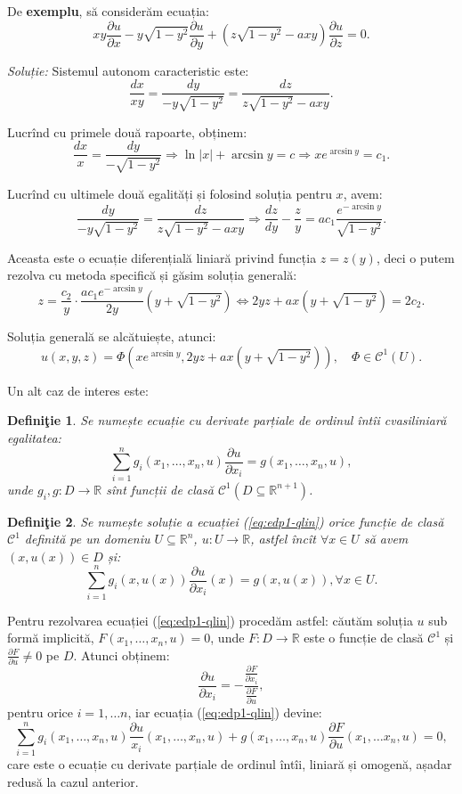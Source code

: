\documentclass[11pt,a4paper]{article}
\newcommand\kal{\mathcal}
\newcommand\seq{\subseteq}
\newcommand\RR{\mathbb{R}}
\theoremstyle{dotless}
\theoremstyle{dotlessdr}
\newtheorem{definition}{Defini\c{t}ie}[section]
\begin{document}
De \textbf{exemplu}, să considerăm ecuația:
\[
  xy \frac{\partial u}{\partial x} - y \sqrt{1 - y^2} \frac{\partial u}{\partial y} + %
  (z \sqrt{1 - y^2} - axy) \frac{\partial u}{\partial z} = 0.
\]

\emph{Soluție:} Sistemul autonom caracteristic este:
\[
  \frac{dx}{xy} = \frac{dy}{-y\sqrt{1 - y^2}} = \frac{dz}{z\sqrt{1 - y^2} - axy}.
\]

Lucrînd cu primele două rapoarte, obținem:
\[
  \frac{dx}{x} = \frac{dy}{-\sqrt{1 - y^2}} \Rightarrow \ln |x| + \arcsin y = c \Rightarrow %
  xe^{\arcsin y} = c_1.
\]

Lucrînd cu ultimele două egalități și folosind soluția pentru $ x $, avem:
\[
  \frac{dy}{-y\sqrt{1 - y^2}} = \frac{dz}{z \sqrt{1 - y^2} - axy} \Rightarrow %
  \frac{dz}{dy} - \frac{z}{y} = ac_1 \frac{e^{-\arcsin y}}{\sqrt{1 - y^2}}.
\]

Aceasta este o ecuație diferențială liniară privind funcția $ z = z(y) $, deci o putem rezolva
cu metoda specifică și găsim soluția generală:
\[
  z = \frac{c_2}{y} \cdot \frac{ac_1 e^{-\arcsin y}}{2y} (y + \sqrt{1 - y^2}) \Leftrightarrow %
  2yz + ax(y + \sqrt{1 - y^2}) = 2c_2.
\]

Soluția generală se alcătuiește, atunci:
\[
  u(x, y, z) = \Phi(xe^{\arcsin y}, 2yz + ax(y + \sqrt{1 - y^2})), \quad \Phi \in \kal{C}^1(U).
\]

Un alt caz de interes este:
\begin{definition}\label{def:edp1-qlin}
  Se numește \emph{ecuație cu derivate parțiale de ordinul întîi cvasiliniară} egalitatea:
  \begin{equation} \label{eq:edp1-qlin}
    \sum_{i = 1}^n g_i(x_1, \dots, x_n, u) \frac{\partial u}{\partial x_i} = g(x_1, \dots, x_n, u),
  \end{equation}
  unde $ g_i, g : D \to \RR $ sînt funcții de clasă $ \kal{C}^1(D \seq \RR^{n+1}) $.
\end{definition}

\begin{definition}\label{def:sol-edp1-qlin}
  Se numește \emph{soluție} a ecuației (\ref{eq:edp1-qlin}) orice funcție de clasă $ \kal{C}^1 $
  definită pe un domeniu $ U \seq \RR^n $, $ u : U \to \RR $, astfel încît $ \forall x \in U $
  să avem $ (x, u(x)) \in D$ și:
  \[
    \sum_{i = 1}^n g_i(x, u(x)) \frac{\partial u}{\partial x_i} (x) = g(x, u(x)), \forall x \in U.
  \]
\end{definition}

Pentru rezolvarea ecuației (\ref{eq:edp1-qlin}) procedăm astfel: căutăm soluția $ u $ sub formă
implicită, $ F(x_1, \dots, x_n, u) = 0 $, unde $F : D \to \RR $ este o funcție de clasă $ \kal{C}^1 $
și $ \frac{\partial F}{\partial u} \neq 0 $ pe $D$. Atunci obținem:
\[
  \frac{\partial u}{\partial x_i} = - \frac{\frac{\partial F}{\partial x_i}}{\frac{\partial F}{\partial u}},
\]
pentru orice $ i = 1, \dots n $, iar ecuația (\ref{eq:edp1-qlin}) devine:
\[
  \sum_{i = 1}^n g_i(x_1, \dots, x_n, u) \frac{\partial u}{x_i} (x_1, \dots, x_n, u) + %
  g(x_1, \dots, x_n, u) \frac{\partial F}{\partial u} (x_1, \dots x_n, u) = 0,
\]
care este o ecuație cu derivate parțiale de ordinul întîi, liniară și omogenă, așadar redusă la
cazul anterior.
\end{document}
